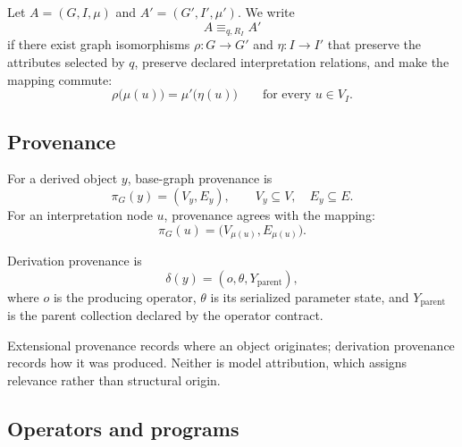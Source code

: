 \begin{definition}
Let \(A=(G,I,\mu)\) and \(A'=(G',I',\mu')\). We write
\begin{equation}
  A\equiv_{q,R_I}A'
\end{equation}
if there exist graph isomorphisms \(\rho:G\to G'\) and \(\eta:I\to I'\) that
preserve the attributes selected by \(q\), preserve declared interpretation
relations, and make the mapping commute:
\begin{equation}
  \rho\bigl(\mu(u)\bigr)=\mu'\bigl(\eta(u)\bigr)
  \qquad\text{for every }u\in V_I.
\end{equation}
\end{definition}

\subsection{Provenance}

\begin{definition}
For a derived object \(y\), base-graph provenance is
\begin{equation}
  \pi_G(y)=(V_y,E_y),
  \qquad V_y\subseteq V,\quad E_y\subseteq E.
\end{equation}
For an interpretation node \(u\), provenance agrees with the mapping:
\begin{equation}
  \pi_G(u)=\bigl(V_{\mu(u)},E_{\mu(u)}\bigr).
\end{equation}
\end{definition}

\begin{definition}
Derivation provenance is
\begin{equation}
  \delta(y)=(o,\theta,Y_{\mathrm{parent}}),
\end{equation}
where \(o\) is the producing operator, \(\theta\) is its serialized parameter
state, and \(Y_{\mathrm{parent}}\) is the parent collection declared by the
operator contract.
\end{definition}

Extensional provenance records where an object originates; derivation
provenance records how it was produced. Neither is model attribution, which
assigns relevance rather than structural origin.

\subsection{Operators and programs}

